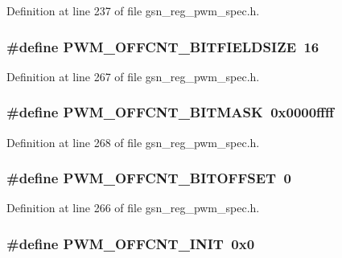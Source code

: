 Definition at line 237 of file gsn\_\-reg\_\-pwm\_\-spec.h.

\hypertarget{a00565_a74e5ecaa49850efdabf02db2adf9fba8}{
\subsubsection[{PWM\_\-OFFCNT\_\-BITFIELDSIZE}]{\setlength{\rightskip}{0pt plus 5cm}\#define PWM\_\-OFFCNT\_\-BITFIELDSIZE~16}}
\label{a00565_a74e5ecaa49850efdabf02db2adf9fba8}


Definition at line 267 of file gsn\_\-reg\_\-pwm\_\-spec.h.

\hypertarget{a00565_a3431544ba0e652cbec2e5ab87ce6ffb6}{
\subsubsection[{PWM\_\-OFFCNT\_\-BITMASK}]{\setlength{\rightskip}{0pt plus 5cm}\#define PWM\_\-OFFCNT\_\-BITMASK~0x0000ffff}}
\label{a00565_a3431544ba0e652cbec2e5ab87ce6ffb6}


Definition at line 268 of file gsn\_\-reg\_\-pwm\_\-spec.h.

\hypertarget{a00565_a8f9fdf1c7df6872936cc569b9bcaa5c6}{
\subsubsection[{PWM\_\-OFFCNT\_\-BITOFFSET}]{\setlength{\rightskip}{0pt plus 5cm}\#define PWM\_\-OFFCNT\_\-BITOFFSET~0}}
\label{a00565_a8f9fdf1c7df6872936cc569b9bcaa5c6}


Definition at line 266 of file gsn\_\-reg\_\-pwm\_\-spec.h.

\hypertarget{a00565_ae3b6c31203f7d1effb77cf64328f3419}{
\subsubsection[{PWM\_\-OFFCNT\_\-INIT}]{\setlength{\rightskip}{0pt plus 5cm}\#define PWM\_\-OFFCNT\_\-INIT~0x0}}
\label{a00565_ae3b6c31203f7d1effb77cf64328f3419}


